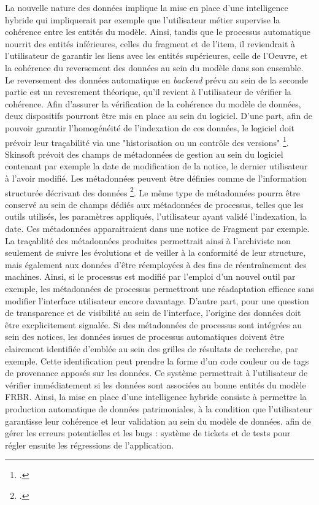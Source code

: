 La nouvelle nature des données implique la mise en place d'une intelligence hybride qui impliquerait par exemple que l'utilisateur métier supervise la cohérence entre les entités du modèle. Ainsi, tandis que le processus automatique nourrit des entités inférieures, celles du fragment et de l'item, il reviendrait à l'utilisateur de garantir les liens avec les entités supérieures, celle de l'Oeuvre, et la cohérence du reversement des données au sein du modèle dans son ensemble. Le reversement des données automatique en \textit{backend} prévu au sein de la seconde partie est un revesrement théorique, qu'il revient à l'utilisateur de vérifier la cohérence. 
Afin d'assurer la vérification de la cohérence du modèle de données, deux dispositifs pourront être mis en place au sein du logiciel. 
D'une part, afin de pouvoir garantir l'homogénéité de l'indexation de ces données, le logiciel doit prévoir leur traçabilité via une "historisation ou un contrôle des versions" \footcite{zotero-item-584}. 
Skinsoft prévoit des champs de métadonnées de gestion au sein du logiciel contenant par exemple la date de modification de la notice, le dernier utilisateur à l'avoir modifié. Les métadonnées peuvent être définies comme de l'information structurée décrivant des données \footcite{colavizza2026}. Le même type de métadonnées pourra être conservé au sein de champs dédiés aux métadonnées de processus, telles que les outils utilisés, les paramètres appliqués, l'utilisateur ayant validé l'indexation, la date. Ces métadonnées apparaitraient dans une notice de Fragment par exemple. 
La traçablité des métadonnées produites permettrait ainsi à l'archiviste non seulement de suivre les évolutions et de veiller à la conformité de leur structure, mais également aux données d'être réemployées à des fins de réentraînement des machines. Ainsi, si le processus est modifié par l'emploi d'un nouvel outil par exemple, les métadonnées de processus permettront une réadaptation efficace sans modifier l'interface utilisateur encore davantage. 
D'autre part, pour une question de transparence et de visibilité au sein de l'interface, l'origine des données doit être excplicitement signalée. Si des métadonnées de processus sont intégrées au sein des notices, les données issues de processus automatiques doivent être clairement identifiée d'emblée au sein des grilles de résultats de recherche, par exemple. Cette identification peut prendre la forme d'un code couleur ou de tags de provenance apposés sur les données. Ce système permettrait à l'utilisateur de vérifier immédiatement si les données sont associées au bonne entités du modèle FRBR. 
Ainsi, la mise en place d'une intelligence hybride consiste à permettre la production automatique de données patrimoniales, à la condition que l'utilisateur garantisse leur cohérence et leur validation au sein du modèle de données. 
afin de gérer les erreurs potentielles et les bugs : système de tickets et de tests pour régler ensuite les régressions de l'application. 

